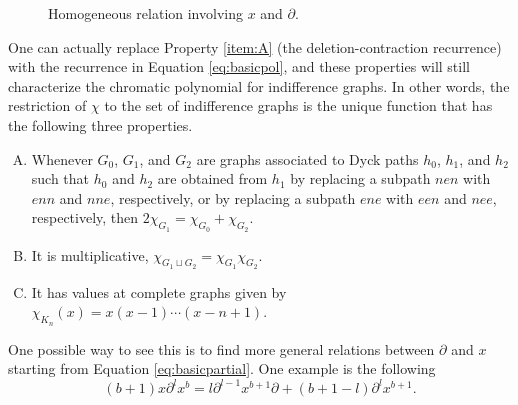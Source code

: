 \documentclass[10pt]{amsart}
\theoremstyle{definition}
\begin{document}
\begin{figure}[htb]
   \caption{Homogeneous relation involving $x$ and $\partial$.}
   \label{fig:xpartialx}
   \end{figure}
    One can actually replace Property \eqref{item:A} (the deletion-contraction recurrence) with the recurrence in Equation \eqref{eq:basicpol}, and these properties will still characterize the chromatic polynomial for indifference graphs. In other words, the restriction of $\chi$ to the set of indifference graphs is the unique function that has the following three properties.
    \begin{enumerate}[(A)]
        \item[(A')]\label{item:A'} Whenever $G_0$, $G_1$, and $G_2$ are graphs associated to Dyck paths $h_0$, $h_1$, and $h_2$ such that $h_0$ and $h_2$ are obtained from $h_1$ by replacing a subpath $nen$ with $enn$ and $nne$,  respectively, or by replacing a subpath $ene$ with $een$ and $nee$, respectively, then $2\chi_{G_1}=\chi_{G_0}+\chi_{G_2}$.
        \item[(B)]\label{item:B'} It is multiplicative, $\chi_{G_1\sqcup G_2}=\chi_{G_1}\chi_{G_2}$.
        \item[(C)]\label{item:C'} It has values at complete graphs given by $\chi_{K_n}(x)=x(x-1)\cdots(x-n+1)$.
    \end{enumerate}
    One possible way to see this is to find more general relations between $\partial$ and $x$ starting from Equation \eqref{eq:basicpartial}. One example is the following
   \begin{equation}
       \label{eq:relpartial}
       (b+1)x\partial^lx^b=l\partial^{l-1}x^{b+1}\partial+(b+1-l)\partial^lx^{b+1}.
   \end{equation}
\end{document}
